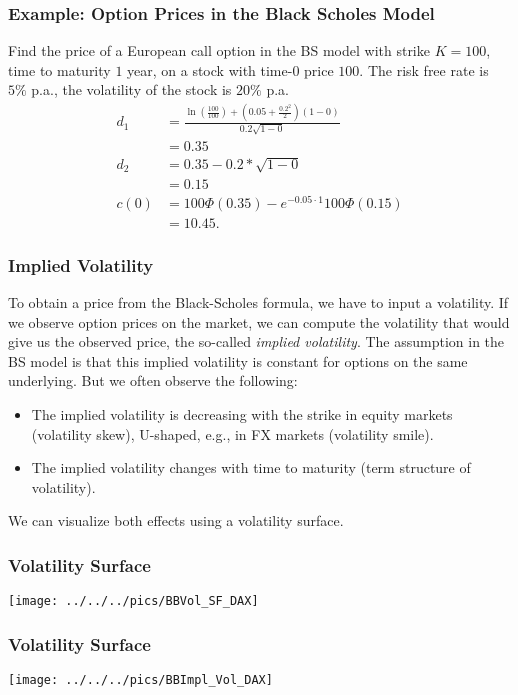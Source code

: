 \begin{frame}[fragile]
\frametitle{Example: Option Prices in the Black Scholes Model}
Find the price of a European call option in the BS model with strike $K=100$,
time to maturity $1$ year, on a stock with time-$0$ price $100$. The risk free
rate is $5\%$ p.a., the volatility of the stock is $20\%$ p.a.
\begin{align*}
  d_1&=\frac{\ln \left(\frac{100}{100} \right) +
  \left(0.05+\frac{0.2^2}{2}\right)(1-0)}{0.2 \sqrt{1-0}}\\&=0.35\\
  d_2&=0.35-0.2*\sqrt{1-0} \\&= 0.15\\
  c(0)&=100 \Phi(0.35) - e^{-0.05\cdot 1}100\Phi(0.15)\\&=10.45.
\end{align*}

\end{frame}

\begin{frame}[fragile]
\frametitle{Implied Volatility}
To obtain a price from the Black-Scholes formula, we have to input a volatility.
If we observe option prices on the market, we can compute the volatility that
would give us the observed price, the so-called \emph{implied volatility}. The
assumption in the BS model is that this implied volatility is constant for
options on the same underlying. But we often observe the following:
\begin{itemize}
  \item The implied volatility is decreasing with the strike in equity markets
  (volatility skew), U-shaped, e.g., in FX markets (volatility smile).
  \item The implied volatility changes with time to maturity (term structure of
  volatility).
\end{itemize}
We can visualize both effects using a volatility surface.
\end{frame}

\begin{frame}[fragile]
\frametitle{Volatility Surface}
\begin{center}
\texttt{[image: ../../../pics/BBVol\_SF\_DAX]}
\end{center}
\end{frame}

\begin{frame}[fragile]
\frametitle{Volatility Surface}
\begin{center}
\texttt{[image: ../../../pics/BBImpl\_Vol\_DAX]}
\end{center}
\end{frame}



